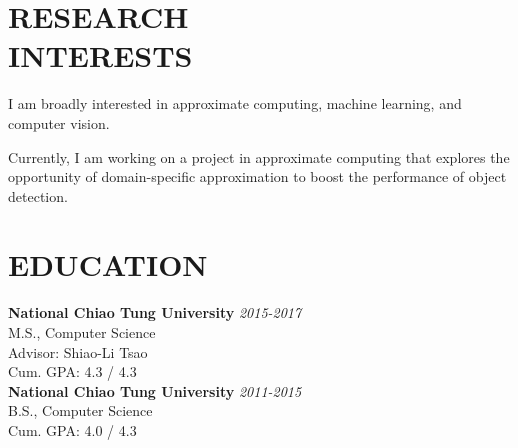 \documentclass[margin, 9pt]{res} %
\begin{document}
\begin{resume}


\vspace*{-5pt}
\section{RESEARCH\\ INTERESTS}

I am broadly interested in approximate computing, machine learning, and computer
vision.

Currently, I am working on a project in approximate computing that explores the
opportunity of domain-specific approximation to boost the performance of object
detection.



\section{EDUCATION}


\textbf{National Chiao Tung University} \hfill\textit{2015-2017}\\
M.S., Computer Science\\
Advisor: Shiao-Li Tsao\\
Cum. GPA: 4.3 / 4.3\\

\vspace*{-5pt}
\textbf{National Chiao Tung University} \hfill\textit{2011-2015}\\
B.S., Computer Science\\
Cum. GPA: 4.0 / 4.3\\


\end{resume}
\end{document}
